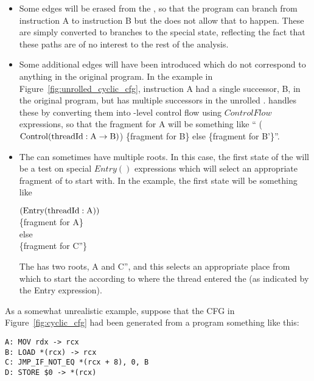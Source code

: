 \begin{itemize}
\item
  Some edges will be erased from the , so that the
  program can branch from instruction A to instruction B but the
   does not allow that to happen.  These are simply
  converted to branches to the special  state,
  reflecting the fact that these paths are of no interest to the rest
  of the analysis.

\item
  Some additional edges will have been introduced which do not
  correspond to anything in the original program.  In the example in
  Figure~\ref{fig:unrolled_cyclic_cfg}, instruction A had a single
  successor, B, in the original program, but has multiple successors
  in the unrolled .  {\Technique} handles these by
  converting them into \StateMachine-level control flow using
  $ControlFlow$ expressions, so that the {\StateMachine} fragment for
  A will be something like `` ($\mathrm{Control}(\mathrm{threadId}:\mathrm{A} \rightarrow \mathrm{B})$)
  \{fragment for B\} else \{fragment for B'\}''.

\item
  The  can sometimes have multiple roots.  In this case,
  the first state of the {\StateMachine} will be a test on special
  $Entry()$ expressions which will select an appropriate fragment of
  {\StateMachine} to start with.  In the example, the first state will
  be something like

   $(\mathrm{Entry}(\mathrm{threadId}:\mathrm{A}))$ \\
  \{fragment for A\} \\
  else \\
  \{fragment for C''\}

  The  has two roots, A and C'', and this selects an
  appropriate place from which to start the 
  according to where the thread entered the  (as
  indicated by the Entry expression).

\end{itemize}

As a somewhat unrealistic example, suppose that the CFG in
Figure~\ref{fig:cyclic_cfg} had been generated from a program
something like this:

\begin{verbatim}
A: MOV rdx -> rcx
B: LOAD *(rcx) -> rcx
C: JMP_IF_NOT_EQ *(rcx + 8), 0, B
D: STORE $0 -> *(rcx)
\end{verbatim}

